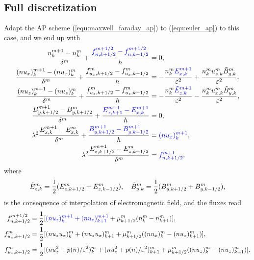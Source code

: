 \documentclass{report}
\begin{document}
\subsection{Full discretization} \label{sec:1f1d-discretization}
Adapt the AP scheme (\ref{equ:maxwell_faraday_ap}) to (\ref{equ:euler_ap}) to this case, and we end up with
\begin{align}
    \frac{n^{m+1}_k - n^m_k}{\delta^m} + \frac{\textcolor{blue}{f^{m+1/2}_{n,k+1/2} - f^{m+1/2}_{n,k-1/2}}}{h} &= 0, \label{equ:1f1d-n}\\
    \frac{(nu_x)^{m+1}_k - (nu_x)^m_k}{\delta^m} + \frac{f^{m}_{u_x,k+1/2} - f^{m}_{u_x,k-1/2}}{h} &= -\frac{n^m_k \textcolor{blue}{E^{m+1}_{x,k}}}{\varepsilon^2} + \frac{n^m_k u^m_{z,k}\Tilde{B}^m_{y,k}}{\varepsilon^2}, \label{equ:1f1d-nux}\\
    \frac{(nu_z)^{m+1}_k - (nu_z)^m_k}{\delta^m} + \frac{f^{m}_{u_z,k+1/2} - f^{m}_{u_z,k-1/2}}{h} &= - \frac{n^m_k \textcolor{blue}{\Tilde{E}^{m+1}_{z,k}}}{\varepsilon^2} - \frac{n^m_k u^m_{x,k}\Tilde{B}^m_{y,k}}{\varepsilon^2}, \label{equ:1f1d-nuz}\\ 
    \frac{B^{m+1}_{y,k+1/2} - B^{m}_{y,k+1/2}}{\delta^m} + \frac{\textcolor{blue}{E^{m+1}_{x,k+1} - E^{m+1}_{x,k}}}{h} &= 0, \label{equ:1f1d-By}\\
    \lambda^2 \frac{E^{m+1}_{x,k} - E^{m}_{x,k}}{\delta^m} + \frac{\textcolor{blue}{B^{m+1}_{y,k+1/2} - B^{m+1}_{y,k-1/2}}}{h} &= \textcolor{blue}{(nu_x)^{m+1}_k}, \label{equ:1f1d-Ex}\\
    \lambda^2 \frac{E^{m+1}_{z,k+1/2} - E^{m}_{z,k+1/2}}{\delta^m} &= \textcolor{blue}{f^{m+1}_{n,k+1/2}}, \label{equ:1f1d-Ez}
\end{align}
where 
\begin{equation*}
    \Tilde{E}^m_{z,k} = \frac{1}{2}(E^m_{z,k+1/2} + E^m_{z,k-1/2}), \ \ \ \Tilde{B}^m_{y,k} = \frac{1}{2}(B^m_{y,k+1/2} + B^m_{y,k-1/2}),
\end{equation*}
is the consequence of interpolation of electromagnetic field, 
and the fluxes read
\begin{align*}
    f^{m+1/2}_{n,k+1/2} & = \frac{1}{2}[\textcolor{blue}{(nu_z)^{m+1}_k + (nu_z)^{m+1}_{k+1}} + \mu^m_{k+1/2}(n^m_k - n^m_{k+1})], \\
    f^{m}_{u_x,k+1/2} & = \frac{1}{2}[(nu_zu_x)^{m}_k + (nu_zu_x)^{m}_{k+1} + \mu^m_{k+1/2}((nu_x)^m_k - (nu_x)^m_{k+1})], \\
    f^{m}_{u_z,k+1/2} & = \frac{1}{2}[(nu_z^2 + p(n)/\varepsilon^2)^{m}_k + (nu_z^2 + p(n)/\varepsilon^2)^{m}_{k+1} + \mu^m_{k+1/2}((nu_z)^m_k - (nu_z)^m_{k+1})]. \\
\end{align*}
\end{document}
